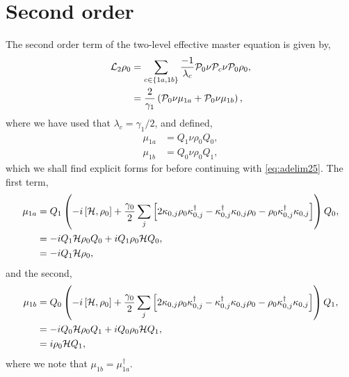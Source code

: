 \section{Second order}

The second order term of the two-level effective master equation is given by,
\begin{align}
	\mathcal{L}_{2}\rho_{0} &= \sum_{c \in \{1a,1b\}} \frac{-1}{\lambda_{c}} \mathcal{P}_{0}\nu\mathcal{P}_{c}\nu\mathcal{P}_{0}\rho_{0}, \notag \\
	&= \frac{2}{\gamma_{1}} \left( \mathcal{P}_{0}\nu\mu_{1a} + \mathcal{P}_{0}\nu\mu_{1b} \right),
	\label{eq:adelim25}
\end{align}
where we have used that \(\lambda_{c} = \gamma_{1}/2\), and defined,
\begin{align}
	\mu_{1a} &= Q_{1}\nu\rho_{0}Q_{0}, \label{eq:adelim26} \\
	\mu_{1b} &= Q_{0}\nu\rho_{0}Q_{1}, \label{eq:adelim27}
\end{align}
which we shall find explicit forms for before continuing with \cref{eq:adelim25}. The first term,
\begin{align}
	\mu_{1a} &= Q_{1} \left( -i\left[\mathcal{H}, \rho_{0}\right] + \frac{\gamma_{0}}{2} \sum_{j}\left[2\kappa_{0,j}\rho_{0}\kappa_{0,j}^{\dagger} - \kappa_{0,j}^{\dagger}\kappa_{0,j}\rho_{0} - \rho_{0}\kappa_{0,j}^{\dagger}\kappa_{0,j}\right]\right)Q_{0}, \notag \\
	&= -iQ_{1}\mathcal{H}\rho_{0}Q_{0} + iQ_{1}\rho_{0}\mathcal{H}Q_{0}, \notag \\
	&= -iQ_{1}\mathcal{H}\rho_{0},
	\label{eq:adelim28}
\end{align}
and the second,
\begin{align}
	\mu_{1b} &= Q_{0} \left( -i\left[\mathcal{H}, \rho_{0}\right] + \frac{\gamma_{0}}{2} \sum_{j}\left[2\kappa_{0,j}\rho_{0}\kappa_{0,j}^{\dagger} - \kappa_{0,j}^{\dagger}\kappa_{0,j}\rho_{0} - \rho_{0}\kappa_{0,j}^{\dagger}\kappa_{0,j}\right]\right)Q_{1}, \notag \\
	&= -iQ_{0}\mathcal{H}\rho_{0}Q_{1} + iQ_{0}\rho_{0}\mathcal{H}Q_{1}, \notag \\
	&= i\rho_{0}\mathcal{H}Q_{1},
	\label{eq:adelim29}
\end{align}
where we note that \(\mu_{1b} = \mu_{1a}^{\dagger}\).

